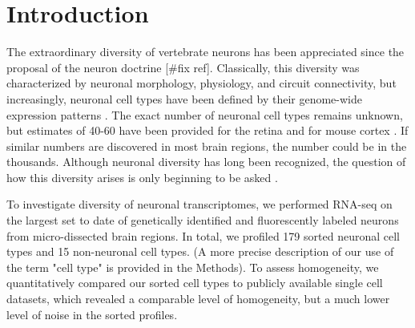 \section*{Introduction}

The extraordinary diversity of vertebrate neurons has been appreciated since the proposal of the neuron doctrine \citep{Cajal_1888} [#fix ref]. Classically, this diversity was characterized by neuronal morphology, physiology, and circuit connectivity, but increasingly, neuronal cell types have been defined by their genome-wide expression patterns \citep{Sugino_2005,Doyle_2008}. The exact number of neuronal cell types remains unknown, but estimates of 40-60 have been provided for the retina \citep{Macosko_2015,Masland_2004} and for mouse cortex \citep{Tasic_2016,Zeisel_2015}. If similar numbers are discovered in most brain regions, the number could be in the thousands. Although neuronal diversity has long been recognized, the question of how this diversity arises is only beginning to be asked \citep{Arendt_2016,Muotri_2006}. 


To investigate diversity of neuronal transcriptomes, we performed RNA-seq on the largest set to date of genetically identified and fluorescently labeled neurons from micro-dissected brain regions. In total, we profiled 179 sorted neuronal cell types and 15 non-neuronal cell types. (A more precise description of our use of the term "cell type" is provided in the Methods). To assess  homogeneity, we quantitatively compared our sorted cell types to publicly available single cell datasets, which revealed a comparable level of homogeneity, but a much lower level of noise in the sorted profiles. 

